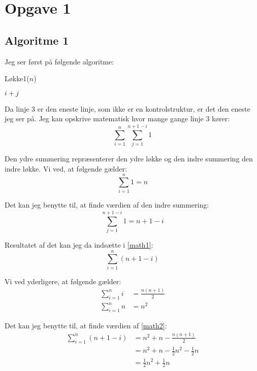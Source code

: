 \section*{Opgave 1}

\subsection*{Algoritme 1}
Jeg ser først på følgende algoritme:
\begin{algorithm}
	\caption{Løkke1($n$)}
	\label{løkke1}
	\begin{algorithmic}[1]
				 $i+j$
			\EndFor
		\EndFor
	\end{algorithmic}
\end{algorithm}

Da linje 3 er den eneste linje, som ikke er en kontrolstruktur, er det den eneste jeg ser på.
Jeg kan opskrive matematisk hvor mange gange linje 3 kører:
\begin{equation}
	\label{math1}
	\sum_{i=1}^{n}\sum_{j=1}^{n+1-i}1
\end{equation}

Den ydre summering repræsenterer den ydre løkke og den indre summering den indre løkke.
Vi ved, at følgende gælder:
\begin{equation*}
	\sum_{i=1}^{n}1 = n
\end{equation*}

Det kan jeg benytte til, at finde værdien af den indre summering:
\begin{equation*}
	\sum_{j=1}^{n+1-i}1 = n+1-i
\end{equation*}

Resultatet af det kan jeg da indsætte i \eqref{math1}:
\begin{equation}
	\label{math2}
	\sum_{i=1}^{n} \left(n+1-i\right)
\end{equation}

Vi ved yderligere, at følgende gælder:
\begin{equation*} \begin{split}
	\sum_{i=1}^{n}i & = \frac{n(n+1)}{2}\\
	\sum_{i=1}^{n}n & = n^2
\end{split} \end{equation*}

Det kan jeg benytte til, at finde værdien af \eqref{math2}:
\begin{equation} \begin{split}
	\label{math3}
	\sum_{i=1}^{n} \left(n+1-i\right) & = n^2 + n - \frac{n(n+1)}{2}\\
	                                  & = n^2 + n - \frac{1}{2}n^2 - \frac{1}{2}n\\
	                                  & = \frac{1}{2}n^2 + \frac{1}{2}n
\end{split} \end{equation}

